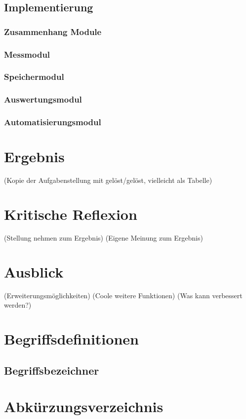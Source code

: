 \documentclass[
    load-dhbw-templates,
    load-preamble = true,
    auto-intro-pages = all,
    add-tocs-to-toc,
    debug = true,
    language = english,
    mainlanguage = ngerman,
    add-bibliography,
    bib-file = dhbw-source.bib,
    biblatex/style = alphabetic, 
]{iodhbwm}
\begin{document}
    \section{Implementierung}
        \subsection{Zusammenhang Module}
        \subsection{Messmodul}
        \subsection{Speichermodul}
        \subsection{Auswertungsmodul}
        \subsection{Automatisierungsmodul}
    
\chapter{Ergebnis}
    (Kopie der Aufgabenstellung mit gelöst/gelöst, vielleicht als Tabelle)
    
\chapter{Kritische Reflexion}
    (Stellung nehmen zum Ergebnis)
    (Eigene Meinung zum Ergebnis)

\chapter{Ausblick}
    (Erweiterungsmöglichkeiten)
    (Coole weitere Funktionen)
    (Was kann verbessert werden?)

\appendix
\chapter{Begriffsdefinitionen}

\section{Begriffsbezeichner} \label{sec:Begriffsbezeichner}




\chapter{Abkürzungsverzeichnis}




\nocite{*}
\end{document}
